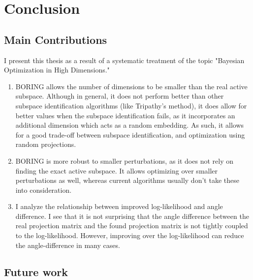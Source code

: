 \chapter{Conclusion}

\ifpdf
    \graphicspath{{Chapter7/Figs/Raster/}{Chapter7/Figs/PDF/}{Chapter7/Figs/}}
\else
    \graphicspath{{Chapter7/Figs/Vector/}{Chapter7/Figs/}}
\fi

\section{Main Contributions}
I present this thesis as a result of a systematic treatment of the topic "Bayesian Optimization in High Dimensions."

\begin{enumerate}
\item BORING allows the number of dimensions to be smaller than the real active subspace.
Although in general, it does not perform better than other subspace identification algorithms (like Tripathy's method), it does allow for better values when the subspace identification fails, as it incorporates an additional dimension which acts as a random embedding.
As such, it allows for a good trade-off between subspace identification, and optimization using random projections.
\item BORING is more robust to smaller perturbations, as it does not rely on finding the exact active subspace.
It allows optimizing over smaller perturbations as well, whereas current algorithms usually don't take these into consideration.
\item I analyze the relationship between improved log-likelihood and angle difference. 
I see that it is not surprising that the angle difference between the real projection matrix and the found projection matrix is not tightly coupled to the log-likelihood.
However, improving over the log-likelihood can reduce the angle-difference in many cases.
\end{enumerate}

\section{Future work}


